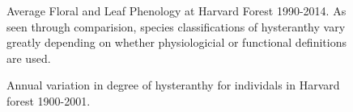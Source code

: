 \documentclass{article}
\begin{document}

\begin{figure}[!tbp]
  \centering
  \caption{Average Floral and Leaf Phenology at Harvard Forest 1990-2014. As seen through comparision, species classifications of hysteranthy vary greatly depending on whether physiologicial or functional definitions are used.}
\end{figure}

\begin{figure}[!tbp]
  \centering
  \caption{Annual variation in degree of hysteranthy for individals in Harvard forest 1900-2001.}
\end{figure}
\end{document}
